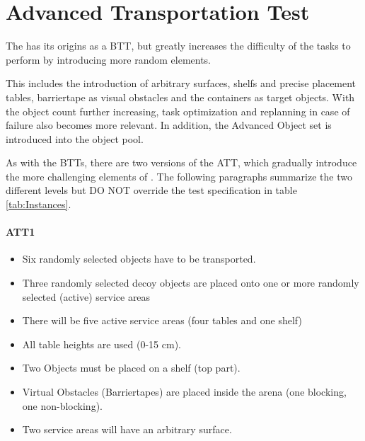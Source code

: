 
\section{Advanced Transportation Test}
\label{sec:Advanced Transportation Test}

The  has its origins as a BTT, but greatly increases the difficulty of the tasks to perform by introducing more random elements. 

This includes the introduction of arbitrary surfaces, shelfs and precise placement tables, barriertape as visual obstacles and the containers as target objects. With the object count further increasing, task optimization and replanning in case of failure also becomes more relevant. In addition, the Advanced Object set is introduced into the object pool.

As with the BTTs, there are two versions of the ATT, which gradually introduce the more challenging elements of \RCAW.
The following paragraphs summarize the two different levels but DO NOT override the test specification in table \ref{tab:Instances}.

\paragraph{ATT1}
\begin{itemize}
\item Six randomly selected objects have to be transported.
\item Three randomly selected decoy objects are placed onto one or more randomly selected (active) service areas
\item There will be five active service areas (four tables and one shelf)
\item All table heights are used (0-15 $\si{\centi\meter}$).
\item Two Objects must be placed on a shelf (top part).
\item Virtual Obstacles (Barriertapes) are placed inside the arena (one blocking, one non-blocking).
\item Two service areas will have an arbitrary surface.
\end{itemize}

